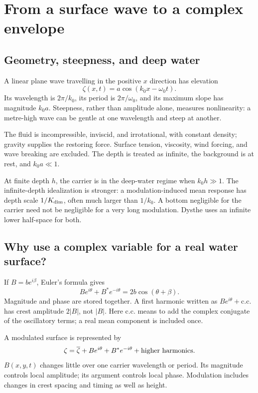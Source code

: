 \section{From a surface wave to a complex envelope}
\label{sec:waves}
\subsection{Geometry, steepness, and deep water}
A linear plane wave travelling in the positive $x$ direction has elevation
\[
 \zeta(x,t)=a\cos(k_0x-\omega_0t).
\]
Its wavelength is $2\pi/k_0$, its period is $2\pi/\omega_0$, and its maximum
slope has magnitude $k_0a$. Steepness, rather than amplitude alone, measures
nonlinearity: a metre-high wave can be gentle at one wavelength and steep
at another.

\begin{assumption}
The fluid is incompressible, inviscid, and irrotational, with constant
density; gravity supplies the restoring force. Surface tension, viscosity,
wind forcing, and wave breaking are excluded. The depth is treated as
infinite, the background is at rest, and $k_0a\ll1$.
\end{assumption}

At finite depth $h$, the carrier is in the deep-water regime when $k_0h\gg1$.
The infinite-depth idealization is stronger: a modulation-induced mean
response has depth scale $1/K_{\rm dim}$, often much larger than $1/k_0$.
A bottom negligible for the carrier need not be negligible for a very long
modulation. Dysthe uses an infinite lower half-space for both.

\subsection{Why use a complex variable for a real water surface?}
If $B=be^{i\beta}$, Euler's formula gives
\[
 Be^{i\theta}+B^*e^{-i\theta}=2b\cos(\theta+\beta).
\]
Magnitude and phase are stored together. A first harmonic written as
$Be^{i\theta}+\mathrm{c.c.}$ has crest amplitude $2|B|$, not $|B|$.
Here c.c. means to add the complex conjugate of the oscillatory terms;
a real mean component is included once.

A modulated surface is represented by
\begin{equation}\label{eq:surface-envelope}
 \zeta=\overline{\zeta}+Be^{i\theta}+B^*e^{-i\theta}
       +\text{higher harmonics}.
\end{equation}
$B(x,y,t)$ changes little over one carrier wavelength or period. Its
magnitude controls local amplitude; its argument controls local phase.
Modulation includes changes in crest spacing and timing as well as height.

